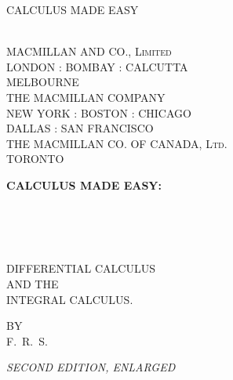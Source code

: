     \frontmatter
    
    
    \cleardoublepage
    \null\vfill
    \thispagestyle{empty}
    \begin{center}
    \Huge CALCULUS MADE EASY
    \end{center}
    \vfill
    
    
    \newpage
    \null\vfill
    \thispagestyle{empty}
    \begin{center}
    \setlength{\MySkip}{4pt}%
     \\[3\MySkip]
    \small MACMILLAN AND CO., \textsc{Limited} \\[\MySkip]
    \scriptsize LONDON : BOMBAY : CALCUTTA \\[\MySkip]
    MELBOURNE \\[3\MySkip]
    \small THE MACMILLAN COMPANY \\[\MySkip]
    \scriptsize NEW YORK : BOSTON : CHICAGO \\[\MySkip]
    DALLAS : SAN FRANCISCO \\[3\MySkip]
    \small THE MACMILLAN CO. OF CANADA, \textsc{Ltd.} \\[\MySkip]
    \scriptsize TORONTO \\[\MySkip]
    \end{center}
    \vfill
    
    
    \cleardoublepage
    \thispagestyle{empty}
    \begin{center}
    \setlength{\MySkip}{12pt}%
    \Huge \textbf{CALCULUS MADE EASY:}
    \vspace{2\MySkip}
    
    \normalsize\settowidth{\TmpLen}{THOSE BEAUTIFUL METHODS OF RECKONING }%
     \\
     \\
     \\
    \vspace{2\MySkip}
    
    \large DIFFERENTIAL CALCULUS \\[\MySkip]
    \small AND THE \\[\MySkip]
    \large INTEGRAL CALCULUS.
    \vfill
    
    \small BY \\
    \Large F.~R.~S.
    \vfill\vfill
    
    \textit{\large SECOND EDITION, ENLARGED}
    \vfill\vfill\vfill\vfill
    
    \large\settowidth{\TmpLen}{ST. MARTIN'S STREET, LONDON}%
     \\
     \\
    \end{center}
    
